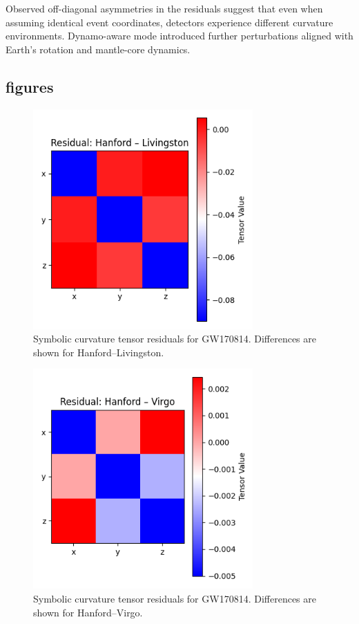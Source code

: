 \documentclass[11pt]{article}
\begin{document}
	Observed off-diagonal asymmetries in the residuals suggest that even when assuming identical event coordinates, detectors experience different curvature environments. Dynamo-aware mode introduced further perturbations aligned with Earth's rotation and mantle-core dynamics.
	
	\subsection*{figures}
	\begin{figure}[H]
		\centering
		\includegraphics[width=0.75\textwidth]{GW170814_Hanford_Livingston_residual.png}
		\caption{Symbolic curvature tensor residuals for GW170814. Differences are shown for Hanford–Livingston.}
		\label{fig:GW170814_Hanford_Livingsto_Residuals}
	\end{figure}
	
    \begin{figure}[H]
		\centering
		\includegraphics[width=0.75\textwidth]{GW170814_Hanford_Virgo_residual.png}
		\caption{Symbolic curvature tensor residuals for GW170814. Differences are shown for Hanford–Virgo.}
		\label{fig:GW170814_Hanford_Virgo_Residuals}
	\end{figure}
	
\end{document}

